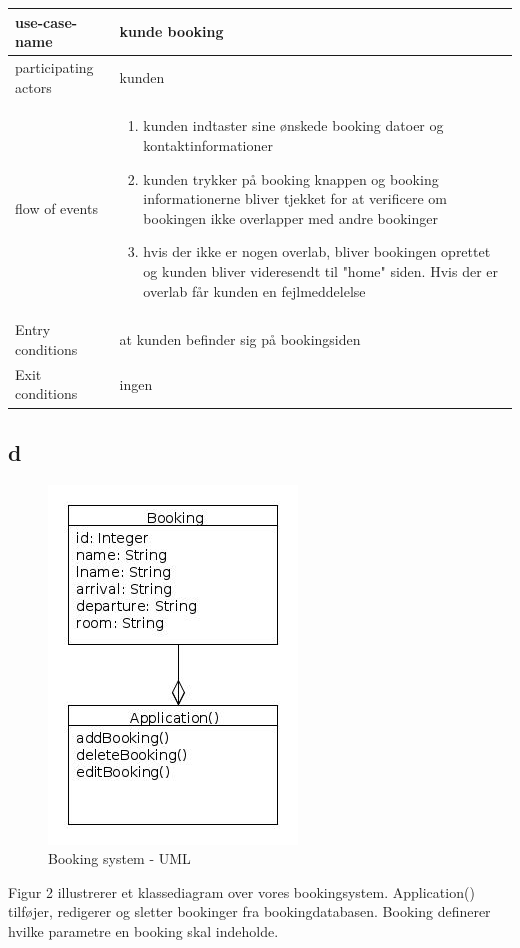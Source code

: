 \documentclass[12pt,a4paper]{article}
\begin{document}
\bigskip

\begin{minipage}{\textwidth}

 \label{tab:title}
\begin{tabular}{| p{5cm} p{10cm} |}
\hline use-case-name & kunde booking \\
\hline participating actors & kunden \\
\hline flow of events & \begin{enumerate}
\item kunden indtaster sine ønskede booking datoer og kontaktinformationer 
\item kunden trykker på booking knappen og booking informationerne bliver tjekket for at verificere om bookingen ikke overlapper med andre bookinger
\item hvis der ikke er nogen overlab, bliver bookingen oprettet og kunden bliver videresendt til "home" siden. Hvis der er overlab får kunden en fejlmeddelelse
\end{enumerate} \\
\hline Entry conditions & at kunden befinder sig på bookingsiden \\
\hline Exit conditions & ingen \\
\hline
\end{tabular}

\end{minipage}	
	
\subsection{d}
\begin{figure}[H]
\centering
\includegraphics[scale=0.6]{BookingSystem.jpg}
\caption{Booking system - UML}
\end{figure}
Figur 2 illustrerer et klassediagram over vores bookingsystem. Application() tilføjer, redigerer og sletter bookinger fra bookingdatabasen. Booking definerer hvilke parametre en booking skal indeholde.
\end{document}

